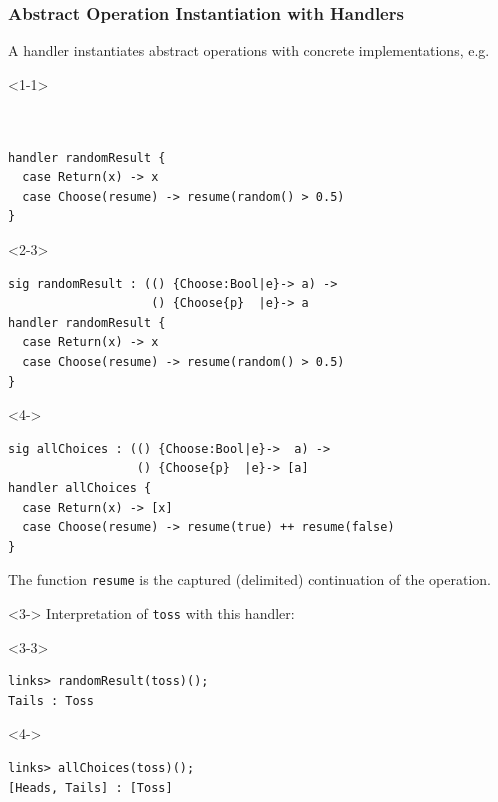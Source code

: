 \documentclass[10pt,compress]{beamer}
\begin{document}
\begin{frame}[fragile]
  \frametitle{Abstract Operation Instantiation with Handlers} 
%
  A handler instantiates abstract operations with concrete
  implementations, e.g.
\begin{onlyenv}<1-1>
\begin{lstlisting}


handler randomResult {
  case Return(x) -> x
  case Choose(resume) -> resume(random() > 0.5)
}
\end{lstlisting}
\end{onlyenv}
%
\begin{onlyenv}<2-3>
\begin{lstlisting}
sig randomResult : (() {Choose:Bool|e}-> a) -> 
                    () {Choose{p}  |e}-> a
handler randomResult {
  case Return(x) -> x
  case Choose(resume) -> resume(random() > 0.5)
}
\end{lstlisting}
\end{onlyenv}
%
\begin{onlyenv}<4->
\begin{lstlisting}
sig allChoices : (() {Choose:Bool|e}->  a) -> 
                  () {Choose{p}  |e}-> [a]
handler allChoices {
  case Return(x) -> [x]
  case Choose(resume) -> resume(true) ++ resume(false)
}
\end{lstlisting}
\end{onlyenv}
%
The function \lstinline$resume$ is the captured (delimited) continuation of the operation.
\vfill
\begin{onlyenv}<3->
Interpretation of \lstinline$toss$ with this handler:
\begin{onlyenv}<3-3>
\begin{lstlisting}[style=terminal]
links> randomResult(toss)();
Tails : Toss
\end{lstlisting}
\end{onlyenv}
%
\begin{onlyenv}<4->
\begin{lstlisting}[style=terminal]
links> allChoices(toss)();
[Heads, Tails] : [Toss]
\end{lstlisting}
\end{onlyenv}
\end{onlyenv}

\end{frame}
\end{document}

